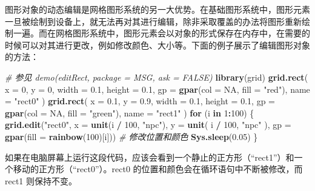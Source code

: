\documentclass[
  b5paper,
  UTF8,twoside]{book}
\newenvironment{Shaded}{\begin{snugshade}}{\end{snugshade}}
\newcommand{\AttributeTok}[1]{\textcolor[rgb]{0.13,0.29,0.53}{#1}}
\newcommand{\CommentTok}[1]{\textcolor[rgb]{0.56,0.35,0.01}{\textit{#1}}}
\newcommand{\ConstantTok}[1]{\textcolor[rgb]{0.56,0.35,0.01}{#1}}
\newcommand{\ControlFlowTok}[1]{\textcolor[rgb]{0.13,0.29,0.53}{\textbf{#1}}}
\newcommand{\DecValTok}[1]{\textcolor[rgb]{0.00,0.00,0.81}{#1}}
\newcommand{\FloatTok}[1]{\textcolor[rgb]{0.00,0.00,0.81}{#1}}
\newcommand{\FunctionTok}[1]{\textcolor[rgb]{0.13,0.29,0.53}{\textbf{#1}}}
\newcommand{\NormalTok}[1]{#1}
\newcommand{\SpecialCharTok}[1]{\textcolor[rgb]{0.81,0.36,0.00}{\textbf{#1}}}
\newcommand{\StringTok}[1]{\textcolor[rgb]{0.31,0.60,0.02}{#1}}
\begin{document}
图形对象的动态编辑是网格图形系统的另一大优势。在基础图形系统中，图形元素一旦被绘制到设备上，就无法再对其进行编辑，除非采取覆盖的办法将图形重新绘制一遍。而在网格图形系统中，图形元素会以对象的形式保存在内存中，在需要的时候可以对其进行更改，例如修改颜色、大小等。下面的例子展示了编辑图形对象的方法：

\begin{Shaded}
\begin{Highlighting}[]
\CommentTok{\# 参见 demo(\textquotesingle{}editRect\textquotesingle{}, package = \textquotesingle{}MSG\textquotesingle{}, ask = FALSE)}
\FunctionTok{library}\NormalTok{(grid)}
\FunctionTok{grid.rect}\NormalTok{(}
  \AttributeTok{x =} \DecValTok{0}\NormalTok{, }\AttributeTok{y =} \DecValTok{0}\NormalTok{, }\AttributeTok{width =} \FloatTok{0.1}\NormalTok{, }\AttributeTok{height =} \FloatTok{0.1}\NormalTok{,}
  \AttributeTok{gp =} \FunctionTok{gpar}\NormalTok{(}\AttributeTok{col =} \ConstantTok{NA}\NormalTok{, }\AttributeTok{fill =} \StringTok{"red"}\NormalTok{), }\AttributeTok{name =} \StringTok{"rect0"}
\NormalTok{)}
\FunctionTok{grid.rect}\NormalTok{(}
  \AttributeTok{x =} \FloatTok{0.1}\NormalTok{, }\AttributeTok{y =} \FloatTok{0.9}\NormalTok{, }\AttributeTok{width =} \FloatTok{0.1}\NormalTok{, }\AttributeTok{height =} \FloatTok{0.1}\NormalTok{,}
  \AttributeTok{gp =} \FunctionTok{gpar}\NormalTok{(}\AttributeTok{col =} \ConstantTok{NA}\NormalTok{, }\AttributeTok{fill =} \StringTok{"green"}\NormalTok{), }\AttributeTok{name =} \StringTok{"rect1"}
\NormalTok{)}
\ControlFlowTok{for}\NormalTok{ (i }\ControlFlowTok{in} \DecValTok{1}\SpecialCharTok{:}\DecValTok{100}\NormalTok{) \{}
  \FunctionTok{grid.edit}\NormalTok{(}\StringTok{"rect0"}\NormalTok{, }\AttributeTok{x =} \FunctionTok{unit}\NormalTok{(i }\SpecialCharTok{/} \DecValTok{100}\NormalTok{, }\StringTok{"npc"}\NormalTok{), }\AttributeTok{y =} \FunctionTok{unit}\NormalTok{(}
\NormalTok{    i }\SpecialCharTok{/} \DecValTok{100}\NormalTok{,}
    \StringTok{"npc"}
\NormalTok{  ), }\AttributeTok{gp =} \FunctionTok{gpar}\NormalTok{(}\AttributeTok{fill =} \FunctionTok{rainbow}\NormalTok{(}\DecValTok{100}\NormalTok{)[i])) }\CommentTok{\# 修改位置和颜色}
  \FunctionTok{Sys.sleep}\NormalTok{(}\FloatTok{0.05}\NormalTok{)}
\NormalTok{\}}
\end{Highlighting}
\end{Shaded}

如果在电脑屏幕上运行这段代码，应该会看到一个静止的正方形（``rect1''）和一个移动的正方形（``rect0''）。rect0 的位置和颜色会在循环语句中不断被修改，而 rect1 则保持不变。
\end{document}
